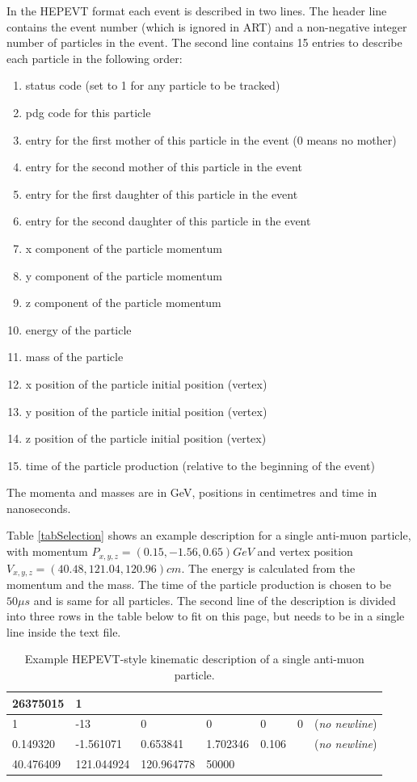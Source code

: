\documentclass[12pt]{article}
\begin{document}
In the HEPEVT format each event is described in two lines. The header line contains the event number (which is ignored in ART) and a non-negative integer number of particles in the event. The second line contains 15 entries to describe each particle in the following order:
\begin{enumerate}
\item status code (set to 1 for any particle to be tracked)
\item pdg code for this particle
\item entry for the first mother of this particle in the event (0 means no mother)
\item entry for the second mother of this particle in the event
\item entry for the first daughter of this particle in the event
\item entry for the second daughter of this particle in the event
\item x component of the particle momentum 
\item y component of the particle momentum
\item z component of the particle momentum
\item energy of the particle
\item mass of the particle
\item x position of the particle initial position (vertex)
\item y position of the particle initial position (vertex)
\item z position of the particle initial position (vertex)
\item time of the particle production (relative to the beginning of the event)
\end{enumerate}

The momenta and masses are in GeV, positions in centimetres and time in nanoseconds.

Table \ref{tabSelection} shows an example description for a single anti-muon particle, with momentum $P_{x,y,z}=\left(0.15, -1.56, 0.65\right)\unit{GeV}$ and vertex position $V_{x,y,z}=\left(40.48,121.04,120.96\right)\unit{cm}$. The energy is calculated from the momentum and the mass. The time of the particle production is chosen to be $50\unit{\mu s}$  and is same for all particles. The second line of the description is divided into three rows in the table below to fit on this page, but needs to be in a single line inside the text file.
\begin{table}
\centering
\begin{tabular}{llllllr}\hline
26375015 & 1 & & & & &\\ \hline
1 & -13 & 0 & 0 & 0 & 0 & (\textit{no newline})\\ 0.149320 & -1.561071 & 0.653841 & 1.702346 & 0.106 & & (\textit{no newline})\\ 40.476409 & 121.044924 & 120.964778 & 50000 & & &\\\hline
\end{tabular}
\caption{Example HEPEVT-style kinematic description of a single anti-muon particle.}
\label{tabHEPEVTOutput}
\end{table}
\end{document}
